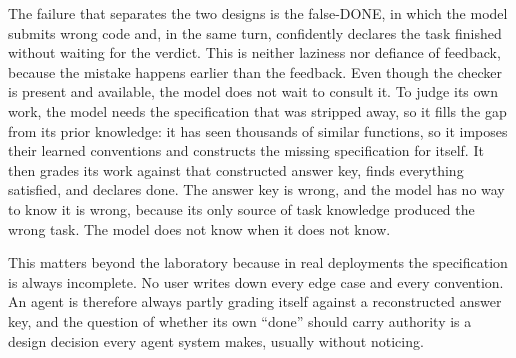 The failure that separates the two designs is the false-DONE, in which the model submits wrong code and, in the same turn, confidently declares the task finished without waiting for the verdict. This is neither laziness nor defiance of feedback, because the mistake happens earlier than the feedback. Even though the checker is present and available, the model does not wait to consult it. To judge its own work, the model needs the specification that was stripped away, so it fills the gap from its prior knowledge: it has seen thousands of similar functions, so it imposes their learned conventions and constructs the missing specification for itself. It then grades its work against that constructed answer key, finds everything satisfied, and declares done. The answer key is wrong, and the model has no way to know it is wrong, because its only source of task knowledge produced the wrong task. The model does not know when it does not know.

This matters beyond the laboratory because in real deployments the specification is always incomplete. No user writes down every edge case and every convention. An agent is therefore always partly grading itself against a reconstructed answer key, and the question of whether its own ``done'' should carry authority is a design decision every agent system makes, usually without noticing.
